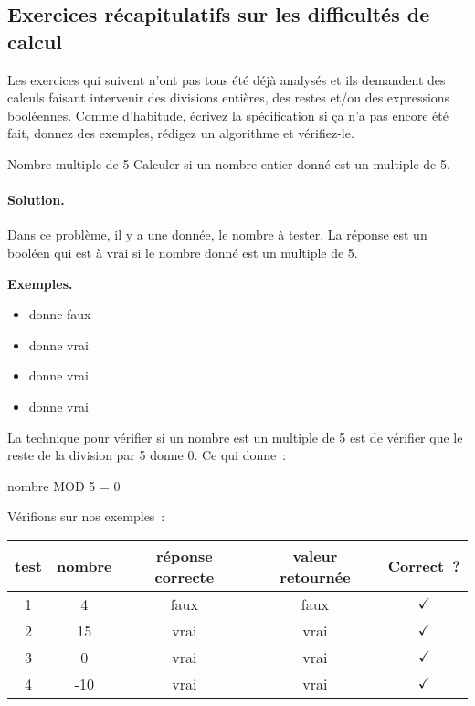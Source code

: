		\subsection{Exercices récapitulatifs sur les difficultés de calcul}
		\label{prem-ex-cplx}
		
			Les exercices qui suivent n’ont pas tous été déjà analysés
			et ils demandent des calculs faisant intervenir
			des divisions entières, des restes et/ou des expressions booléennes.
			Comme d’habitude, écrivez la spécification
			si ça n’a pas encore été fait,
			donnez des exemples, rédigez un algorithme
			et vérifiez-le.
		
			\begin{Exercice}{Nombre multiple de 5}
				\label{algo:mult5}
				Calculer si un nombre entier donné est un multiple de 5.
				\paragraph{Solution.}
				Dans ce problème,
				il y a une donnée, le nombre à tester.
				La réponse est un booléen
				qui est à vrai si le nombre donné est un multiple de 5.
				\begin{center}
				\end{center}
				\textbf{Exemples.}
				\begin{multicols}{4}
					\begin{itemize}
					\item {} donne faux
					\item {} donne vrai
					\item {} donne vrai
					\item {} donne vrai
					\end{itemize}
				\end{multicols}
				La technique pour vérifier si un nombre est
				un multiple de 5 est de vérifier que le reste
				de la division par 5 donne 0.
				Ce qui donne~:
				\begin{LDA}[1]
						\Return nombre MOD 5 = 0
					\EndAlgo
				\end{LDA}
				Vérifions sur nos exemples~:
				\begin{center}
				\begin{tabular}{|c|c|c|c|c|}
				\hline
				test \no & nombre & réponse correcte & valeur retournée & Correct~? \\\hline
				\hline 
				1 & 4   & faux & faux & {\color{ForestGreen}$\checkmark$} \\\hline
				2 & 15  & vrai & vrai & {\color{ForestGreen}$\checkmark$} \\\hline
				3 & 0   & vrai & vrai & {\color{ForestGreen}$\checkmark$} \\\hline
				4 & -10 & vrai & vrai & {\color{ForestGreen}$\checkmark$} \\\hline
				\end{tabular}
				\end{center}
			\end{Exercice}


